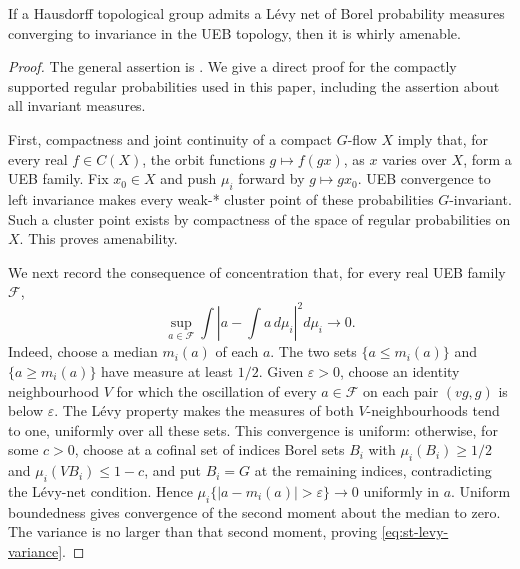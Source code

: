 \begin{theorem}\label{thm:st-schneider}
If a Hausdorff topological group admits a L\'evy net of Borel
probability measures converging to invariance in the UEB topology,
then it is whirly amenable.
\end{theorem}
\begin{proof}
The general assertion is \cite[Corollary 5.7]{Schneider2019}.
We give a direct proof for the compactly supported regular probabilities
used in this paper, including the assertion about all invariant measures.

First, compactness and joint continuity of a compact \(G\)-flow \(X\)
imply that, for every real \(f\in C(X)\), the orbit functions
\(g\mapsto f(gx)\), as \(x\) varies over \(X\), form a UEB family.
Fix \(x_0\in X\) and push \(\mu_i\) forward by \(g\mapsto gx_0\).
UEB convergence to left invariance makes every weak-* cluster point
of these probabilities \(G\)-invariant. Such a cluster point exists
by compactness of the space of regular probabilities on \(X\).
This proves amenability.

We next record the consequence of concentration that, for every
real UEB family \(\mathcal F\),
\begin{equation}\label{eq:st-levy-variance}
 \sup_{a\in\mathcal F}
 \int\left|a-\int a\,d\mu_i\right|^2d\mu_i\longrightarrow0.
\end{equation}
Indeed, choose a median \(m_i(a)\) of each \(a\). The two sets
\(\{a\leq m_i(a)\}\) and \(\{a\geq m_i(a)\}\) have measure at least
\(1/2\). Given \(\varepsilon>0\), choose an identity neighbourhood
\(V\) for which the oscillation of every \(a\in\mathcal F\) on each
pair \((vg,g)\) is below \(\varepsilon\). The L\'evy property makes
the measures of both \(V\)-neighbourhoods tend to one, uniformly
over all these sets. This convergence is uniform: otherwise, for some
\(c>0\), choose at a cofinal set of indices Borel sets \(B_i\) with
\(\mu_i(B_i)\geq1/2\) and \(\mu_i(VB_i)\leq1-c\), and put
\(B_i=G\) at the remaining indices, contradicting the L\'evy-net
condition. Hence
\(\mu_i\{|a-m_i(a)|>\varepsilon\}\to0\) uniformly in \(a\).
Uniform boundedness gives convergence of the second moment about
the median to zero. The variance is no larger than that second
moment, proving \eqref{eq:st-levy-variance}.


\end{proof}
